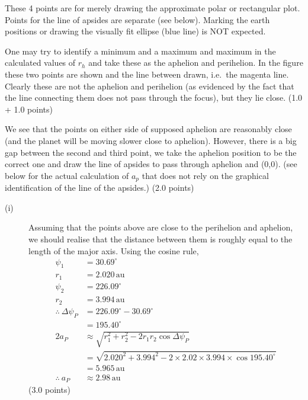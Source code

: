 \begin{description}

  These 4 points are for merely drawing the approximate polar or rectangular
  plot. Points for the line of apsides are separate (see below). Marking the
  earth positions or drawing the visually fit ellipse (blue line) is NOT
  expected.

  One may try to identify a minimum and a maximum and maximum in the %
  calculated values of $r_h$ and take these as the aphelion and perihelion. In
  the figure these two points are shown and the line between drawn, i.e.\ the
  magenta line. Clearly these are not the aphelion and perihelion (as
  evidenced by the fact that the line connecting them does not pass through
  the focus), but they lie close. \hfill(1.0 + 1.0 points)

  We see that the points on either side of supposed aphelion are reasonably
  close (and the planet will be moving slower close to aphelion). However,
  there is a big gap between the second and third point, we take the aphelion
  position to be the correct one and draw the line of apsides to pass through
  aphelion and (0,0). (see below for the actual calculation of $a_p$ that does
  not rely on the graphical identification of the line of the apsides.)
  \hfill(2.0 points)

\item[(b)]
  \begin{description}
  \item[(i)] Assuming that the points above are close to the perihelion and
    aphelion, we should realise that the distance between them is roughly
    equal to the length of the major axis. Using the cosine rule,
    \begin{align*}
      \psi_1 &= 30.69^\circ \\
      r_1 &= 2.020\,\mathrm{au} \\
      \psi_2 &= 226.09^\circ \\
      r_2 &= 3.994\,\mathrm{au} \\
      \therefore\ \Delta\psi_P &= 226.09^\circ - 30.69^\circ \\
        &= 195.40^\circ \\
      2a_P &\approx \sqrt{r_1^2 + r_2^2 - 2r_1 r_2\cos\Delta\psi_P} \\
        &= \sqrt{2.020^2 + 3.994^2
           - 2\times2.02\times3.994\times\cos195.40^\circ} \\
        &= 5.965\,\mathrm{au} \\
      \therefore\ a_P &\approx 2.98\,\mathrm{au}
    \end{align*}
    \hfill(3.0 points)


\end{description}
\end{description}
